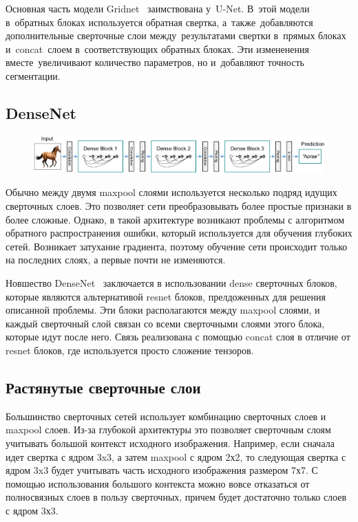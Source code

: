 Основная часть модели Gridnet~\cite{gridnet} заимствована у~U-Net. 
В~этой модели в~обратных блоках используется обратная свертка, 
а~также~добавляются дополнительные сверточные слои между~результатами 
свертки в~прямых блоках и~concat~слоем в~соответствующих обратных блоках. 
Эти измененения вместе~увеличивают количество параметров, но и~добавляют
точность сегментации.

\subsection{DenseNet}

\begin{figure}[ht]
  \includegraphics[width=\textwidth,keepratio]{img/densenet}
\end{figure}

Обычно между двумя maxpool слоями используется несколько подряд идущих сверточных слоев. Это позволяет сети преобразовывать более простые признаки в более сложные. Однако, в такой архитектуре возникают проблемы с алгоритмом обратного распространения ошибки, который используется для обучения глубоких сетей. Возникает затухание градиента, поэтому обучение сети происходит только на последних слоях, а первые почти не изменяются. 

Новшество DenseNet~\cite{densenet} заключается в использовании dense сверточных блоков, которые являются альтернативой resnet блоков\cite{resnet}, прелдоженных для решения описанной проблемы. Эти блоки располагаются между maxpool слоями, и каждый сверточный слой связан со всеми сверточными слоями этого блока, которые идут после него. Связь реализована с помощью concat слоя в отличие от resnet блоков, где используется просто сложение тензоров.   

\subsection{Растянутые сверточные слои}

Большинство сверточных сетей использует комбинацию сверточных слоев и maxpool слоев. Из-за глубокой архитектуры это позволяет сверточным слоям учитывать большой контекст исходного изображения. Например, если сначала идет свертка с ядром 3x3, а затем maxpool с ядром 2х2, то следующая свертка с ядром 3x3 будет учитывать часть исходного изображения размером 7х7. С помощью использования большого контекста можно вовсе отказаться от полносвязных слоев в пользу сверточных, причем будет достаточно только слоев с ядром 3х3.

